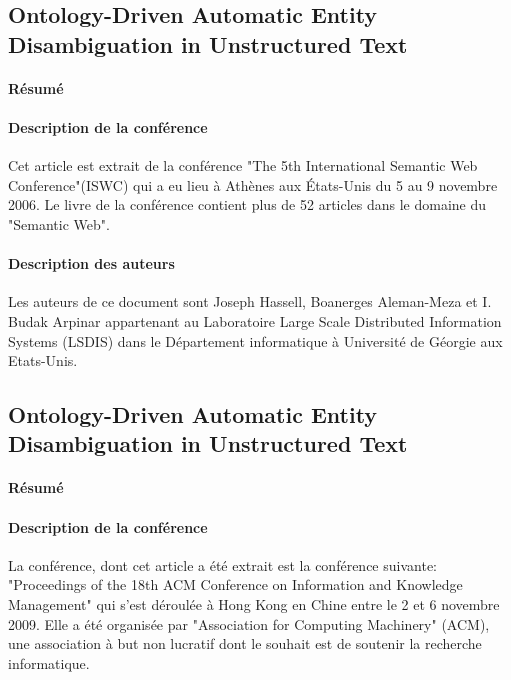 \documentclass{article}
\begin{document}
\subsection{Ontology-Driven Automatic Entity Disambiguation in Unstructured Text\cite{article-6}}
\paragraph{Résumé}


\paragraph{Description de la conférence}
Cet article est extrait de la conférence "The 5th International Semantic Web Conference"(ISWC) qui a eu lieu à Athènes aux États-Unis du 5 au 9 novembre 2006. Le livre de la conférence contient plus de 52 articles dans le domaine du "Semantic Web".

\paragraph{Description des auteurs}
Les auteurs de ce document sont Joseph Hassell, Boanerges Aleman-Meza et I. Budak Arpinar appartenant au Laboratoire Large Scale Distributed Information Systems (LSDIS) dans le Département informatique à Université de Géorgie aux Etats-Unis.

\subsection{Ontology-Driven Automatic Entity Disambiguation in Unstructured Text\cite{article-8}}
\paragraph{Résumé}


\paragraph{Description de la conférence}
La conférence, dont cet article a été extrait est la conférence suivante: "Proceedings of the 18th ACM Conference on Information and Knowledge Management" qui s'est déroulée à Hong Kong en Chine entre le 2 et 6 novembre 2009. Elle a été organisée par "Association for Computing Machinery" (ACM), une association à but non lucratif dont le souhait est de soutenir la recherche informatique.
\end{document}
